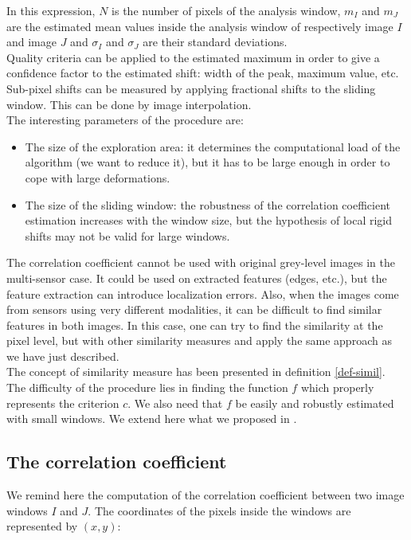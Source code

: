 In this expression, $N$ is the number of pixels of the analysis
window, $m_I$ and $m_J$ are the estimated mean values inside the
analysis window of respectively image $I$ and image $J$ and $\sigma_I$
and $\sigma_J$ are their standard deviations.\\

Quality criteria can be applied to the estimated maximum in order to
 give a confidence factor to the estimated shift: width of the peak,
 maximum value, etc. Sub-pixel shifts can be measured by applying
 fractional shifts to the sliding window. This can be done by image interpolation.\\

The interesting parameters of the procedure are:
\begin{itemize}
\item The size of the exploration area: it determines the
computational load of the algorithm (we want to reduce it), but it has
to be large enough in order to cope with large deformations.
\item The size of the sliding window: the robustness of the correlation
coefficient estimation increases with the window size, but the
hypothesis of local rigid shifts may not be valid for large windows.
\end{itemize}

The correlation coefficient cannot be used with original grey-level
images in the multi-sensor case. It could be used on extracted
features (edges, etc.), but the feature extraction can introduce
localization errors. Also, when the images come from sensors using
very different modalities, it can be difficult to find similar
features in both images. In this case, one can try to find the
similarity at the pixel level, but with other similarity measures and
apply the same approach as we have just described.\\

The concept of similarity measure has been presented in definition
\ref{def-simil}. The difficulty of the procedure lies in finding the
function $f$ which properly represents the criterion $c$. We also need
that $f$ be easily and robustly estimated with small windows. We extend here what we proposed in \cite{ig02simil}.\\

\subsection{The correlation coefficient\label{expe}}
We remind here the computation of the correlation coefficient between
two image windows $I$ and $J$. The coordinates of the pixels inside
the windows are represented by $(x,y)$:

